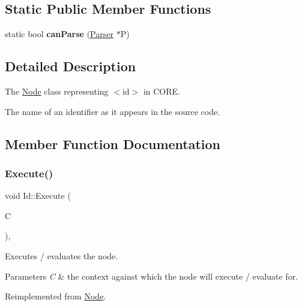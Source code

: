 \subsection*{Static Public Member Functions}
\begin{DoxyCompactItemize}
\item 
\mbox{\label{class_id_a0f58bea5b01f28dfa0d4a7e4237a7ff0}} 
static bool {\bfseries can\+Parse} (\mbox{\hyperlink{class_parser}{Parser}} $\ast$P)
\end{DoxyCompactItemize}


\subsection{Detailed Description}
The \mbox{\hyperlink{class_node}{Node}} class representing {\ttfamily $<$id$>$} in C\+O\+RE. 

The name of an identifier as it appears in the source code. 

\subsection{Member Function Documentation}
\mbox{\label{class_id_a3fc54b723e5c48d0f575e08b4e54caef}} 
\subsubsection{\texorpdfstring{Execute()}{Execute()}}
{\footnotesize\ttfamily void Id\+::\+Execute (\begin{DoxyParamCaption}\item[{\mbox{\hyperlink{class_a_s_t_context}{A\+S\+T\+Context}} \&}]{C }\end{DoxyParamCaption})\hspace{0.3cm}{\ttfamily [override]}, {\ttfamily [virtual]}}

Executes / evaluates the node. 
\begin{DoxyParams}{Parameters}
{\em C} & the context against which the node will execute / evaluate for. \\
\hline
\end{DoxyParams}


Reimplemented from \mbox{\hyperlink{class_node_a27ad1ba81d2596817b361368282bcbfa}{Node}}.

\mbox{\label{class_id_a79e18030494873748efcaf6ea530a35f}} 
